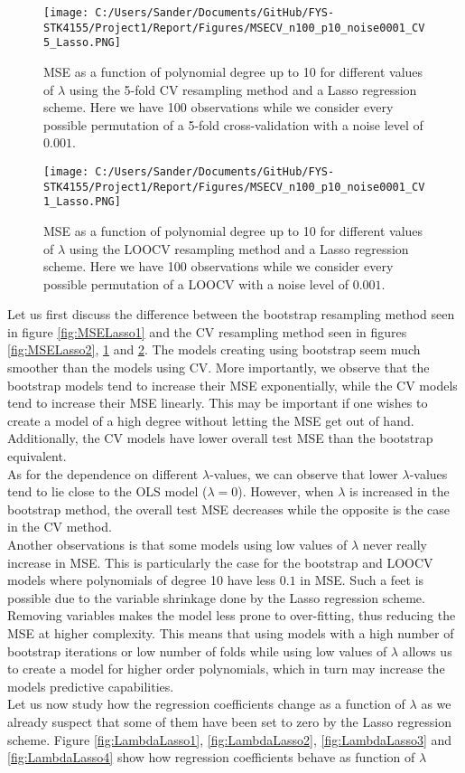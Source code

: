 \documentclass[12pt,a4paper]{article}
\begin{document}
\begin{figure}[H]
\centering
\texttt{[image: C:/Users/Sander/Documents/GitHub/FYS-STK4155/Project1/Report/Figures/MSECV\_n100\_p10\_noise0001\_CV5\_Lasso.PNG]}
\caption{\label{fig:MSELasso3} MSE as a function of polynomial degree up to 10 for different values of $\lambda$ using the 5-fold CV resampling method and a Lasso regression scheme. Here we have 100 observations while we consider every possible permutation of a 5-fold cross-validation with a noise level of $0.001$.}
\end{figure}

\begin{figure}[H]
\centering
\texttt{[image: C:/Users/Sander/Documents/GitHub/FYS-STK4155/Project1/Report/Figures/MSECV\_n100\_p10\_noise0001\_CV1\_Lasso.PNG]}
\caption{\label{fig:MSELasso4} MSE as a function of polynomial degree up to 10 for different values of $\lambda$ using the LOOCV resampling method and a Lasso regression scheme. Here we have 100 observations while we consider every possible permutation of a LOOCV with a noise level of $0.001$.}
\end{figure}

\noindent Let us first discuss the difference between the bootstrap resampling method seen in figure \ref{fig:MSELasso1} and the CV resampling method seen in figures \ref{fig:MSELasso2}, \ref{fig:MSELasso3} and \ref{fig:MSELasso4}. The models creating using bootstrap seem much smoother than the models using CV. More importantly, we observe that the bootstrap models tend to increase their MSE exponentially, while the CV models tend to increase their MSE linearly. This may be important if one wishes to create a model of a high degree without letting the MSE get out of hand. Additionally, the CV models have lower overall test MSE than the bootstrap equivalent. 
\\
As for the dependence on different $\lambda$-values, we can observe that lower $\lambda$-values tend to lie close to the OLS model ($\lambda = 0$). However, when $\lambda$ is increased in the bootstrap method, the overall test MSE decreases while the opposite is the case in the CV method. 
\\
Another observations is that some models using low values of $\lambda$ never really increase in MSE. This is particularly the case for the bootstrap and LOOCV models where polynomials of degree 10 have less $0.1$ in MSE. Such a feet is possible due to the variable shrinkage done by the Lasso regression scheme. Removing variables makes the model less prone to over-fitting, thus reducing the MSE at higher complexity. This means that using models with a high number of bootstrap iterations or low number of folds while using low values of $\lambda$ allows us to create a model for higher order polynomials, which in turn may increase the models predictive capabilities.
\\
Let us now study how the regression coefficients change as a function of $\lambda$ as we already suspect that some of them have been set to zero by the Lasso regression scheme. Figure \ref{fig:LambdaLasso1}, \ref{fig:LambdaLasso2}, \ref{fig:LambdaLasso3} and \ref{fig:LambdaLasso4} show how regression coefficients behave as function of $\lambda$
\end{document}
